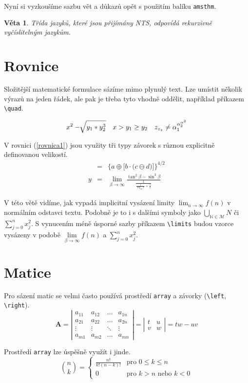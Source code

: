 \documentclass[a4paper, 11pt, twocolumn]{article}
\theoremstyle{definition}
\theoremstyle{plain}
\newtheorem{veta}{Věta}
\begin{document}
        Nyní si vyzkoušíme sazbu vět a důkazů opět s použitím balíku \texttt{amsthm}.


        \begin{veta}
            Třída jazyků, které jsou přijímány NTS, odpovídá \emph{rekurzivně vyčíslitelným jazykům}.
        \end{veta}

\section{Rovnice}

Složitější matematické formulace sázíme mimo plynulý text. Lze umístit několik výrazů na jeden řádek, ale pak je třeba tyto vhodně oddělit, například příkazem \verb|\quad|.

        \begin{eqnarray}
            x^2 - \sqrt[\leftroot{4}]{y_1 * y_2^{3}} \quad x > y_1 \geq y_2 \quad z_{z_{z}} \neq \alpha_1^{\alpha_2^{\alpha^3}} \nonumber         
        \end{eqnarray}


V rovnici (\ref{rovnica1}) jsou využity tři typy závorek s různou explicitně definovanou velikostí.
        \begin{eqnarray}
            \label{rovnica1} & = & \bigg\{ a \oplus \Big[ b \cdot \big(c \ominus d\big) \Big] \bigg\}^{4/2} \\
			 \label{rovnica2} y & = & \lim_{\beta\to\infty} \frac{\tan^2 \beta - \sin^3 \beta}{\frac{1}{\frac{1}{\log_{42}x}+\frac{1}{2}}}
        \end{eqnarray}    

V této větě vidíme, jak vypadá implicitní vysázení limity $\lim_{n\to\infty} f(n)$ v normálním odstavci textu. Podobně je to i s dalšími symboly jako $\bigcup_{\mathbb{N}\in\mathcal{M}}N$ či $\sum_{j=0}^n x_j^2$.  S vynucením méně úsporné sazby příkazem \verb|\limits| budou vzorce vysázeny v podobě $\lim\limits_{\beta\to\infty} f(n)$ a $\sum\limits_{j=0}^n x_j^2$. 

\section{Matice}

Pro sázení matic se velmi často používá prostředí \texttt{array} a závorky (\verb|\left|, \verb|\right|).
    $$
		\mathbf{A} =
        \left|
		\begin{array}{cccc}
			a_{11} & a_{12} & \ldots & a_{1n} \\
			a_{21} & a_{22} & \ldots & a_{2n} \\
			\vdots & \vdots & \ddots & \vdots \\
			a_{m1} & a_{m2} & \ldots & a_{mn}
		\end{array}
		\right|
		= 
		\left|
		\begin{array}{cc}
			t & u \\
			v & w
		\end{array}
		\right|
		= tw - uv
    $$
    
Prostředí \texttt{array} lze úspěšně využít i jinde.
    $$
		\binom{n}{k} =
		\left\{
		\begin{array}{ll}
			\frac{n!}{k! (n - k)!} & \text{pro } 0 \leq k \leq n \\
			0 & \text{pro } k > n \text{ nebo } k < 0
		\end{array}
		\right.
	$$
\end{document}

